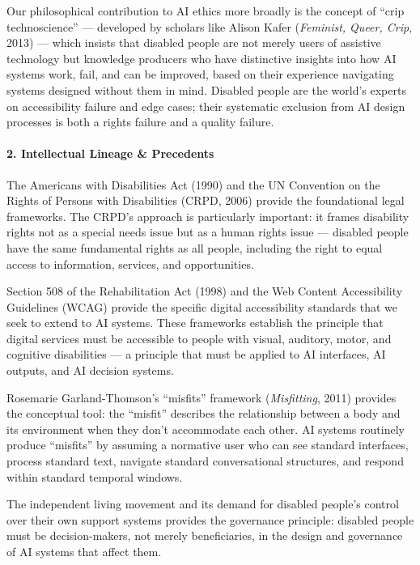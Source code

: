 Our philosophical contribution to AI ethics more broadly is the concept
of ``crip technoscience'' --- developed by scholars like Alison Kafer
(\emph{Feminist, Queer, Crip}, 2013) --- which insists that disabled
people are not merely users of assistive technology but knowledge
producers who have distinctive insights into how AI systems work, fail,
and can be improved, based on their experience navigating systems
designed without them in mind. Disabled people are the world's experts
on accessibility failure and edge cases; their systematic exclusion from
AI design processes is both a rights failure and a quality failure.

\paragraph{2. Intellectual Lineage \&
Precedents}\label{intellectual-lineage-precedents-40}

The Americans with Disabilities Act (1990) and the UN Convention on the
Rights of Persons with Disabilities (CRPD, 2006) provide the
foundational legal frameworks. The CRPD's approach is particularly
important: it frames disability rights not as a special needs issue but
as a human rights issue --- disabled people have the same fundamental
rights as all people, including the right to equal access to
information, services, and opportunities.

Section 508 of the Rehabilitation Act (1998) and the Web Content
Accessibility Guidelines (WCAG) provide the specific digital
accessibility standards that we seek to extend to AI systems. These
frameworks establish the principle that digital services must be
accessible to people with visual, auditory, motor, and cognitive
disabilities --- a principle that must be applied to AI interfaces, AI
outputs, and AI decision systems.

Rosemarie Garland-Thomson's ``misfits'' framework (\emph{Misfitting},
2011) provides the conceptual tool: the ``misfit'' describes the
relationship between a body and its environment when they don't
accommodate each other. AI systems routinely produce ``misfits'' by
assuming a normative user who can see standard interfaces, process
standard text, navigate standard conversational structures, and respond
within standard temporal windows.

The independent living movement and its demand for disabled people's
control over their own support systems provides the governance
principle: disabled people must be decision-makers, not merely
beneficiaries, in the design and governance of AI systems that affect
them.

